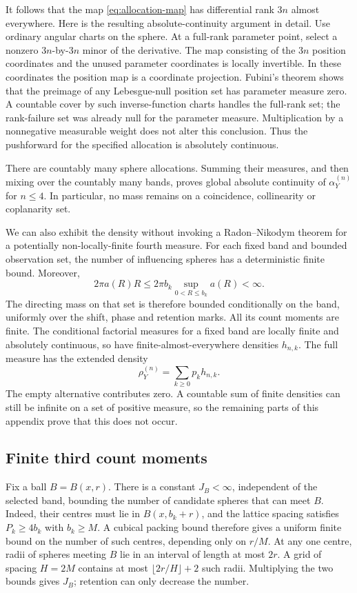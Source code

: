 \documentclass[11pt,a4paper]{article}
\numberwithin{equation}{section}
\theoremstyle{definition}
\theoremstyle{remark}
\begin{document}
It follows that the map \eqref{eq:allocation-map} has differential rank
$3n$ almost everywhere. Here is the resulting absolute-continuity argument
in detail. Use ordinary angular charts on the sphere. At a full-rank
parameter point, select a nonzero $3n$-by-$3n$ minor of the derivative.
The map consisting of the $3n$ position coordinates and the unused
parameter coordinates is locally invertible. In these coordinates the
position map is a coordinate projection. Fubini's theorem shows that the
preimage of any Lebesgue-null position set has parameter measure zero.
A countable cover by such inverse-function charts handles the full-rank
set; the rank-failure set was already null for the parameter measure.
Multiplication by a nonnegative measurable weight does not alter this
conclusion. Thus the pushforward for the specified allocation is
absolutely continuous.

There are countably many sphere allocations. Summing their measures, and
then mixing over the countably many bands, proves global absolute
continuity of $\alpha_Y^{(n)}$ for $n\leq4$. In particular, no mass remains
on a coincidence, collinearity or coplanarity set.

We can also exhibit the density without invoking a Radon--Nikodym theorem
for a potentially non-locally-finite fourth measure. For each fixed band
and bounded observation set, the number of influencing spheres has a
deterministic finite bound. Moreover,
\[
 2\pi a(R)R\leq2\pi b_k\sup_{0<R\leq b_k}a(R)<\infty.
\]
The directing mass on that set is therefore bounded conditionally on the
band, uniformly over the shift, phase and retention marks. All its count
moments are finite. The conditional factorial measures for a fixed band
are locally finite and absolutely continuous, so have finite-almost-everywhere
densities $h_{n,k}$. The full measure has the extended density
\begin{equation}
 \rho_Y^{(n)}=\sum_{k\geq0}p_kh_{n,k}.
 \label{eq:band-density-sum}
\end{equation}
The empty alternative contributes zero. A countable sum of finite densities
can still be infinite on a set of positive measure, so the remaining
parts of this appendix prove that this does not occur.

\subsection{Finite third count moments}
\label{app:third-moment}

Fix a ball $B=B(x,r)$. There is a constant $J_B<\infty$, independent of the
selected band, bounding the number of candidate spheres that can meet
$B$. Indeed, their centres must lie in $B(x,b_k+r)$, and the lattice
spacing satisfies $P_k\geq4b_k$ with $b_k\geq M$. A cubical packing bound
therefore gives a uniform finite bound on the number of such centres,
depending only on $r/M$. At any one centre, radii of spheres meeting $B$
lie in an interval of length at most $2r$. A grid of spacing $H=2M$
contains at most $\lfloor2r/H\rfloor+2$ such radii. Multiplying the two
bounds gives $J_B$; retention can only decrease the number.
\end{document}
